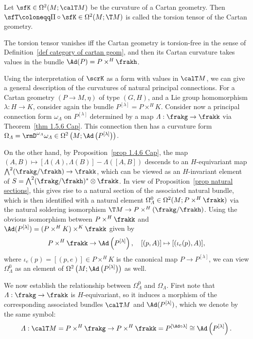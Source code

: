 \begin{defn}
    Let $\sfK\in\Omega^2(M;\calT M)$ be the curvature of a Cartan geometry. Then $\sfT\coloneqq \Pi\circ\sfK\in\Omega^2(M;\T M)$ is called the torsion tensor of the Cartan geometry.

    The torsion tensor vanishes iff the Cartan geometry is torsion-free in the sense of Definition~\ref{def category of cartan geom}, and then its Cartan curvature takes values in the bundle $\Ad(P)=P\times^H \frakh$.
\end{defn}

Using the interpretation of $\scrK$ as a form with values in $\calT M$, we can give a general description of the curvatures of natural principal connections. For a Cartan geometry $(P\to M,\eta)$ of type $(G,H)$, and a Lie group homomorphism $\lambda:H\to K$, consider again the bundle $P^{[\lambda]}=P\times^H K$. Consider now a principal connection form $\omega_\varLambda$ on $P^{[\lambda]}$ determined by a map $\varLambda:\frakg\to\frakk$ via Theorem~\ref{thm 1.5.6 Cap}. This connection then has a curvature form $\Omega_\varLambda=\rmD^{\omega_\varLambda}\omega_\varLambda\in\Omega^2\left(M;\Ad\left(P^{[\lambda]}\right)\right)$.

On the other hand, by Proposition~\ref{prop 1.4.6 Cap}, the map $(A,B)\mapsto [\varLambda(A),\varLambda(B)]-\varLambda([A,B])$ descends to an $H$-equivariant map $\bigwedge^2(\frakg\slash\frakh)\to \frakk$, which can be viewed as an $H$-invariant element of $S=\bigwedge^2(\frakg\slash\frakh)^\ast\otimes\frakk$. In view of Proposition~\ref{prop natural sections}, this gives rise to a natural section of the associated natural bundle, which is then identified with a natural element $\Omega^0_\varLambda\in\Omega^2(M;P\times^H \frakk)$ via the natural soldering isomorphism $\T M\to P\times^H(\frakg\slash\frakh)$.  Using the obvious isomorphism between $P\times^H \frakk$ and $\Ad(P^{[\lambda]})=(P\times^H K)\times^K\frakk$ given by 
\[P\times^H \frakk\to \Ad\left(P^{[\lambda]}\right),\quad [(p,A)]\mapsto [(\iota_e(p),A)],\]
where $\iota_e(p)=[(p,e)]\in P\times^H K$ is the canonical map $P\to P^{[\lambda]}$, we can view $\Omega^0_\varLambda$ as an element of $\Omega^2\left(M;\Ad\left(P^{[\lambda]}\right)\right)$ as well.

We now establish the relationship between $\Omega^0_\varLambda$ and $\Omega_\varLambda$. First note that $\varLambda:\frakg\to \frakk$ is $H$-equivariant, so it induces a morphism of the corresponding associated bundles $\calT M$ and $\Ad(P^{[\lambda]})$, which we denote by the same symbol:
\[\varLambda: \calT M=P\times^H\frakg\to P\times^H \frakk =P^{[\Ad\circ \lambda]}\cong \Ad\left(P^{[\lambda]}\right).\]


